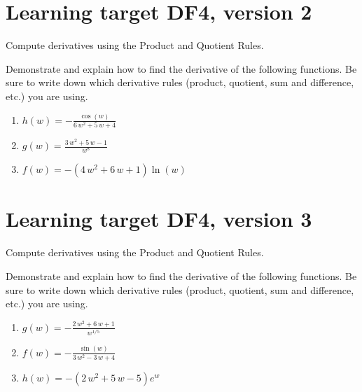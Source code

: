\pagebreak

\section{Learning target DF4, version 2}

Compute derivatives using the Product and Quotient Rules.

\hrulefill

Demonstrate and explain how to find the derivative of the following functions. Be sure to write down which derivative rules (product, quotient, sum and difference, etc.) you are using.

\begin{enumerate}
    \item \(\renewcommand{\log}{\ln} h(w)= -\frac{\cos\left(w\right)}{6 \, w^{2} + 5 \, w + 4}\)
    \vfill
    \item \( \renewcommand{\log}{\ln} g(w)= \frac{3 \, w^{2} + 5 \, w - 1}{w^{8}}\)
    \vfill
    \item \(\renewcommand{\log}{\ln} f(w)= -{\left(4 \, w^{2} + 6 \, w + 1\right)} \log\left(w\right)\)
    \vfill
\end{enumerate}

\pagebreak

\section{Learning target DF4, version 3}

Compute derivatives using the Product and Quotient Rules.

\hrulefill

Demonstrate and explain how to find the derivative of the following functions. Be sure to write down which derivative rules (product, quotient, sum and difference, etc.) you are using.

\begin{enumerate}
    \item \(\renewcommand{\log}{\ln} g(w)= -\frac{2 \, w^{2} + 6 \, w + 1}{w^{1/5}}\)
    \vfill
    \item \(\renewcommand{\log}{\ln} f(w)= -\frac{\sin\left(w\right)}{3 \, w^{2} - 3 \, w + 4}\)
    \vfill
    \item \(\renewcommand{\log}{\ln} h(w)= -{\left(2 \, w^{2} + 5 \, w - 5\right)} e^{w}\)
    \vfill
\end{enumerate}

